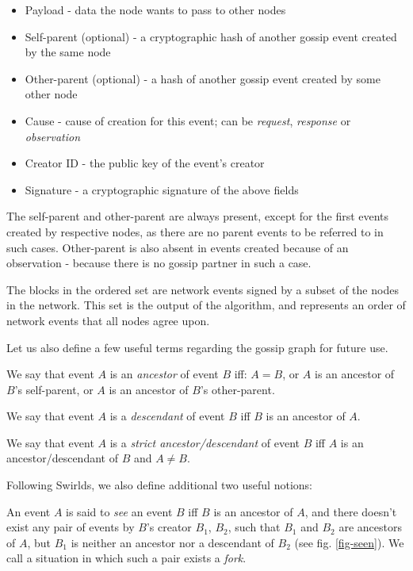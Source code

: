 \documentclass[a4paper,fleqn]{article}
\begin{document}
\begin{itemize}
		\item Payload - data the node wants to pass to other nodes
		\item Self-parent (optional) - a cryptographic hash of another gossip event created by the
			same node
		\item Other-parent (optional) - a hash of another gossip event created by some other node
		\item Cause - cause of creation for this event; can be \emph{request}, \emph{response} or
			\emph{observation}
		\item Creator ID - the public key of the event's creator
		\item Signature - a cryptographic signature of the above fields
\end{itemize}

The self-parent and other-parent are always present, except for the first events created by
respective nodes, as there are no parent events to be referred to in such cases. Other-parent is
also absent in events created because of an observation - because there is no gossip partner in
such a case.

The blocks in the ordered set are network events signed by a subset of the nodes in the network.
This set is the output of the algorithm, and represents an order of network events that all nodes
agree upon.

Let us also define a few useful terms regarding the gossip graph for future use.

\begin{defn}
	We say that event $A$ is an \emph{ancestor} of event $B$ iff: $A = B$, or $A$ is an ancestor of
	$B$'s self-parent, or $A$ is an ancestor of $B$'s other-parent.
\end{defn}

\begin{defn}
	We say that event $A$ is a \emph{descendant} of event $B$ iff $B$ is an ancestor of $A$.
\end{defn}

\begin{defn}
	We say that event $A$ is a \emph{strict ancestor/descendant} of event $B$ iff $A$ is an
	ancestor/descendant of $B$ and $A \neq B$.
\end{defn}

Following Swirlds\cite{hg}, we also define additional two useful notions:

\begin{defn}
	An event $A$ is said to \emph{see} an event $B$ iff $B$ is an ancestor of $A$, and there
	doesn't exist any pair of events by $B$'s creator $B_1$, $B_2$, such that $B_1$ and $B_2$ are
	ancestors of $A$, but $B_1$ is neither an ancestor nor a descendant of $B_2$ (see fig.
	\ref{fig-seen}). We call a situation in which such a pair exists a \emph{fork}.
\end{defn}
\end{document}

